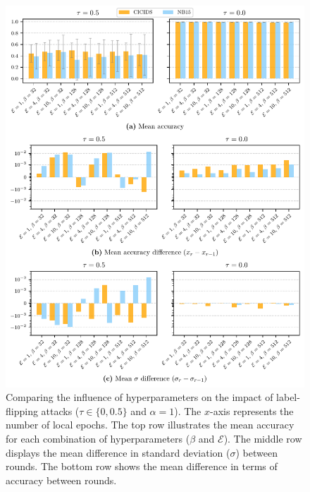 \begin{figure}
  \centering
  \includegraphics[width=\linewidth]{figures/hyperparams-continous.pdf}
  \caption[
    Comparing the influence of hyperparameters on the impact of label-flipping attacks.
  ]{
    Comparing the influence of hyperparameters on the impact of label-flipping attacks ($\tau \in \lbrace 0, 0.5 \rbrace$ and $\alpha=1$).
    The $x$-axis represents the number of local epochs.
    The top row illustrates the mean accuracy for each combination of hyperparameters ($\beta$ and $\mathcal{E}$).
    The middle row displays the mean difference in standard deviation ($\sigma$) between rounds.
    The bottom row shows the mean difference in terms of accuracy between rounds.
    \label{fig:assess.hyperparams-continuous}
  }
\end{figure}


